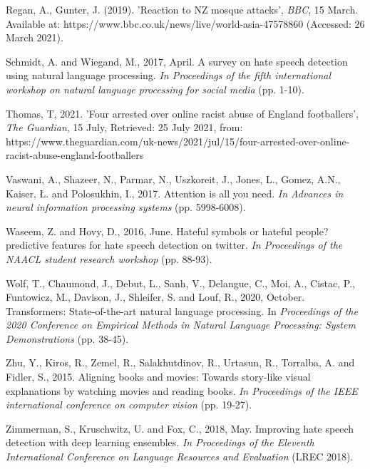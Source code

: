 \documentclass[conference]{IEEEtran}
\begin{document}
\begin{thebibliography}{00}
 Regan, A., Gunter, J. (2019). 'Reaction to NZ mosque attacks', \textit{BBC}, 15 March. Available at: https://www.bbc.co.uk/news/live/world-asia-47578860 (Accessed: 26 March 2021).

 Schmidt, A. and Wiegand, M., 2017, April. A survey on hate speech detection using natural language processing. \textit{In Proceedings of the fifth international workshop on natural language processing for social media} (pp. 1-10).

 Thomas, T, 2021. 'Four arrested over online racist abuse of England footballers', \textit{The Guardian}, 15 July, Retrieved: 25 July 2021, from: https://www.theguardian.com/uk-news/2021/jul/15/four-arrested-over-online-racist-abuse-england-footballers

 Vaswani, A., Shazeer, N., Parmar, N., Uszkoreit, J., Jones, L., Gomez, A.N., Kaiser, Ł. and Polosukhin, I., 2017. Attention is all you need. \textit{In Advances in neural information processing systems} (pp. 5998-6008).

 Waseem, Z. and Hovy, D., 2016, June. Hateful symbols or hateful people? predictive features for hate speech detection on twitter. \textit{In Proceedings of the NAACL student research workshop} (pp. 88-93).

 Wolf, T., Chaumond, J., Debut, L., Sanh, V., Delangue, C., Moi, A., Cistac, P., Funtowicz, M., Davison, J., Shleifer, S. and Louf, R., 2020, October. Transformers: State-of-the-art natural language processing. In \textit{Proceedings of the 2020 Conference on Empirical Methods in Natural Language Processing: System Demonstrations} (pp. 38-45).

 Zhu, Y., Kiros, R., Zemel, R., Salakhutdinov, R., Urtasun, R., Torralba, A. and Fidler, S., 2015. Aligning books and movies: Towards story-like visual explanations by watching movies and reading books. \textit{In Proceedings of the IEEE international conference on computer vision} (pp. 19-27).

 Zimmerman, S., Kruschwitz, U. and Fox, C., 2018, May. Improving hate speech detection with deep learning ensembles. \textit{In Proceedings of the Eleventh International Conference on Language Resources and Evaluation} (LREC 2018).

\end{thebibliography}
\vspace{12pt}
\end{document}
